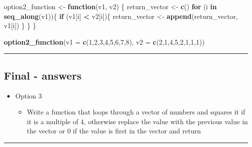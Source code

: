 \documentclass[]{article}
\newenvironment{Shaded}{\begin{snugshade}}{\end{snugshade}}
\newcommand{\ControlFlowTok}[1]{\textcolor[rgb]{0.13,0.29,0.53}{\textbf{#1}}}
\newcommand{\DataTypeTok}[1]{\textcolor[rgb]{0.13,0.29,0.53}{#1}}
\newcommand{\DecValTok}[1]{\textcolor[rgb]{0.00,0.00,0.81}{#1}}
\newcommand{\KeywordTok}[1]{\textcolor[rgb]{0.13,0.29,0.53}{\textbf{#1}}}
\newcommand{\NormalTok}[1]{#1}
\newcommand{\OperatorTok}[1]{\textcolor[rgb]{0.81,0.36,0.00}{\textbf{#1}}}
\newcommand{\StringTok}[1]{\textcolor[rgb]{0.31,0.60,0.02}{#1}}
\providecommand{\tightlist}{%
  \setlength{\itemsep}{0pt}\setlength{\parskip}{0pt}}
\begin{document}
\begin{Shaded}
\begin{Highlighting}[]
\NormalTok{option2_function <-}\StringTok{ }\ControlFlowTok{function}\NormalTok{(v1, v2) \{}
\NormalTok{  return_vector <-}\StringTok{ }\KeywordTok{c}\NormalTok{()}
  \ControlFlowTok{for}\NormalTok{ (i }\ControlFlowTok{in} \KeywordTok{seq_along}\NormalTok{(v1))\{}
    \ControlFlowTok{if}\NormalTok{ (v1[i] }\OperatorTok{<}\StringTok{ }\NormalTok{v2[i])\{}
\NormalTok{      return_vector <-}\StringTok{ }\KeywordTok{append}\NormalTok{(return_vector, v1[i])}
\NormalTok{      \}}
\NormalTok{  \}}
\NormalTok{\}}

\KeywordTok{option2_function}\NormalTok{(}\DataTypeTok{v1 =} \KeywordTok{c}\NormalTok{(}\DecValTok{1}\NormalTok{,}\DecValTok{2}\NormalTok{,}\DecValTok{3}\NormalTok{,}\DecValTok{4}\NormalTok{,}\DecValTok{5}\NormalTok{,}\DecValTok{6}\NormalTok{,}\DecValTok{7}\NormalTok{,}\DecValTok{8}\NormalTok{), }\DataTypeTok{v2 =} \KeywordTok{c}\NormalTok{(}\DecValTok{2}\NormalTok{,}\DecValTok{1}\NormalTok{,}\DecValTok{4}\NormalTok{,}\DecValTok{5}\NormalTok{,}\DecValTok{2}\NormalTok{,}\DecValTok{1}\NormalTok{,}\DecValTok{1}\NormalTok{,}\DecValTok{1}\NormalTok{))}
\end{Highlighting}
\end{Shaded}

\begin{center}\rule{0.5\linewidth}{\linethickness}\end{center}

\hypertarget{final---answers-2}{%
\subsection{Final - answers}\label{final---answers-2}}

\begin{itemize}
\tightlist
\item
  Option 3

  \begin{itemize}
  \tightlist
  \item
    Write a function that loops through a vector of numbers and squares
    it if it is a multiple of 4, otherwise replace the value with the
    previous value in the vector or 0 if the value is first in the
    vector and return
  \end{itemize}
\end{itemize}

\begin{center}\rule{0.5\linewidth}{\linethickness}\end{center}
\end{document}
